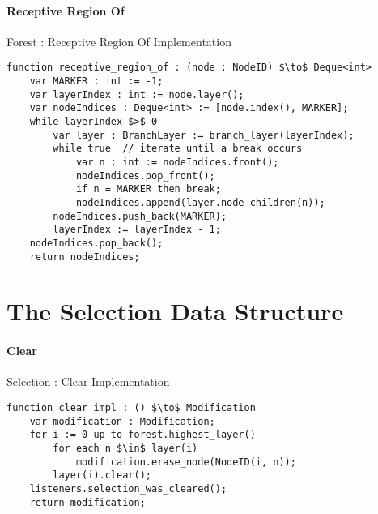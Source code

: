 \paragraph{Receptive Region Of}

\begin{stulisting}[H]
\caption{Forest : Receptive Region Of Implementation}
\begin{lstlisting}[style=Default]
function receptive_region_of : (node : NodeID) $\to$ Deque<int>
	var MARKER : int := -1;
	var layerIndex : int := node.layer();
	var nodeIndices : Deque<int> := [node.index(), MARKER];
	while layerIndex $>$ 0
		var layer : BranchLayer := branch_layer(layerIndex);
		while true	// iterate until a break occurs
			var n : int := nodeIndices.front();
			nodeIndices.pop_front();
			if n = MARKER then break;
			nodeIndices.append(layer.node_children(n));
		nodeIndices.push_back(MARKER);
		layerIndex := layerIndex - 1;
	nodeIndices.pop_back();
	return nodeIndices;
\end{lstlisting}
\end{stulisting}

\section{The Selection Data Structure}

\paragraph{Clear}

\begin{stulisting}[H]
\caption{Selection : Clear Implementation}
\begin{lstlisting}[style=Default]
function clear_impl : () $\to$ Modification
	var modification : Modification;
	for i := 0 up to forest.highest_layer()
		for each n $\in$ layer(i)
			modification.erase_node(NodeID(i, n));
		layer(i).clear();
	listeners.selection_was_cleared();
	return modification;
\end{lstlisting}
\end{stulisting}

